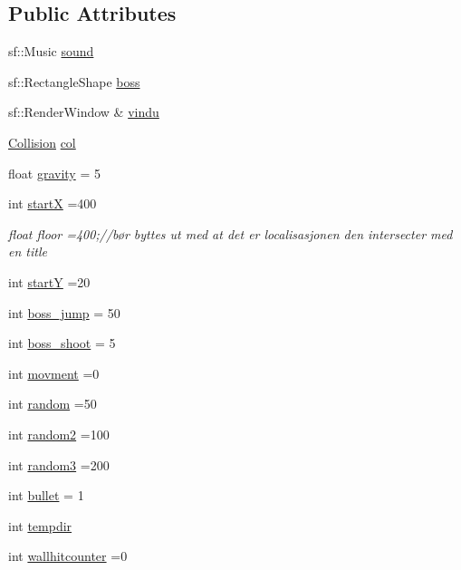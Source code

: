 \subsection*{Public Attributes}
\begin{DoxyCompactItemize}
\item 
sf\+::\+Music \hyperlink{classboss__fight__3_ae053483e317a20358d3df14f6f9b2945}{sound}
\item 
sf\+::\+Rectangle\+Shape \hyperlink{classboss__fight__3_a2480d76c3edb348b0fb73a8119c9d30f}{boss}
\item 
sf\+::\+Render\+Window \& \hyperlink{classboss__fight__3_a04f218c9ae59c20b06c5bc19a49ce391}{vindu}
\item 
\hyperlink{class_collision}{Collision} \hyperlink{classboss__fight__3_a295b9c6b1bc68af57675c8eba5000536}{col}
\item 
float \hyperlink{classboss__fight__3_aa3b9f67908b6918081aabecb54b18547}{gravity} = 5
\item 
int \hyperlink{classboss__fight__3_a9b5d173179bff91703b1c0093de3c7b9}{startX} =400
\begin{DoxyCompactList}\small\item\em float floor =400;//bør byttes ut med at det er localisasjonen den intersecter med en title \end{DoxyCompactList}\item 
int \hyperlink{classboss__fight__3_aba10025ed72c90bc57d0577f31383976}{startY} =20
\item 
int \hyperlink{classboss__fight__3_ac6429ba0ce3bf0a524b7fae7fcdae9b6}{boss\+\_\+jump} = 50
\item 
int \hyperlink{classboss__fight__3_a992244b468d2685c37553f4af23a50bc}{boss\+\_\+shoot} = 5
\item 
int \hyperlink{classboss__fight__3_abe87612260269ddeee353b88954a2368}{movment} =0
\item 
int \hyperlink{classboss__fight__3_a7e5ef868637491ac49e34968532c1706}{random} =50
\item 
int \hyperlink{classboss__fight__3_aa65054f06ce0fc4faefa43054656503f}{random2} =100
\item 
int \hyperlink{classboss__fight__3_a20c2d1c9079b2326ae287a78d17934c0}{random3} =200
\item 
int \hyperlink{classboss__fight__3_a4fd6b3576ac48484ba51f99b796ac6d1}{bullet} = 1
\item 
int \hyperlink{classboss__fight__3_a8f4f2db36bc7a685b1565dd5d7744106}{tempdir}
\item 
int \hyperlink{classboss__fight__3_a5db42320e3221354945d930dfac3a7fa}{wallhitcounter} =0
\end{DoxyCompactItemize}
